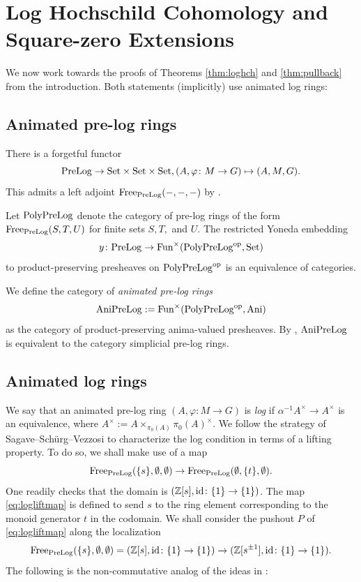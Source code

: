 \documentclass[a4paper,10pt%
]{amsart}
\numberwithin{equation}{section}
\theoremstyle{definition}
\renewcommand{\:}{\colon}
\begin{document}
\section{Log Hochschild Cohomology and Square-zero Extensions}\label{sec:lastsection} We now work towards the proofs of Theorems \ref{thm:loghch} and \ref{thm:pullback} from the introduction. Both statements (implicitly) use animated log rings: 

\subsection{Animated pre-log rings} There is a forgetful functor \[{\rm PreLog} \to {\rm Set} \times {\rm Set} \times {\rm Set}, (A, \varphi \colon M \to G) \mapsto (A, M, G).\] This admits a left adjoint ${\rm Free}_{\rm PreLog}(-, -, -)$ by \cite[Remark 14.12(1)]{ARV11}.  

Let ${\rm PolyPreLog}$ denote the category of pre-log rings of the form ${\rm Free}_{\rm PreLog}(S, T, U)$ for finite sets $S, T,$ and $U$. The restricted Yoneda embedding \[y \colon {\rm PreLog} \to {\rm Fun}^{\times}({\rm PolyPreLog}^{\rm op}, {\rm Set})\] to product-preserving presheaves on ${\rm PolyPreLog}^{\rm op}$ is an equivalence of categories.

We define the category of \emph{animated pre-log rings} \[{\rm AniPreLog} := {\rm Fun}^{\times}({\rm PolyPreLog}^{\rm op}, {\rm Ani})\] as the category of product-preserving anima-valued presheaves. By \cite[5.5.9.1, 5.5.9.3]{Lur09}, ${\rm AniPreLog}$ is equivalent to the category simplicial pre-log rings.

\subsection{Animated log rings} We say that an animated pre-log ring $(A, \varphi \colon M \to G)$ is \emph{log} if $\alpha^{-1}A^\times \to A^\times$ is an equivalence, where $A^\times := A \times_{\pi_0(A)} \pi_0(A)^\times$. We follow the strategy of Sagave--Sch\"urg--Vezzosi \cite[Section 3.1]{SSV16} to characterize the log condition in terms of a lifting property. To do so, we shall make use of a map \begin{equation}\label{eq:logliftmap}{\rm Free}_{\rm PreLog}(\{s\}, \emptyset, \emptyset) \to {\rm Free}_{\rm PreLog}(\emptyset, \{t\}, \emptyset).\end{equation} One readily checks that the domain is $({\Bbb Z}[s], {\rm id} \colon \{1\} \to \{1\})$. The map \eqref{eq:logliftmap} is defined to send $s$ to the ring element corresponding to the monoid generator $t$ in the codomain. We shall consider the pushout $P$ of \eqref{eq:logliftmap} along the localization \[{\rm Free}_{{\rm PreLog}}(\{s\}, \emptyset, \emptyset) = ({\Bbb Z}[s], {\rm id} \colon \{1\} \to \{1\}) \to ({\Bbb Z}[s^{\pm 1}], {\rm id} \colon \{1\} \to \{1\}).\] The following is the non-commutative analog of the ideas in \cite[Section 3.1]{SSV16}:
\end{document}
